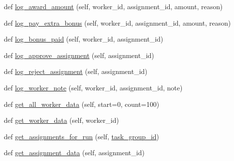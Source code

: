 \begin{DoxyCompactItemize}
\item 
def \hyperlink{classparlai_1_1mturk_1_1core_1_1dev_1_1mturk__data__handler_1_1MTurkDataHandler_a70ba0bf16c83138626c33c71a041674f}{log\+\_\+award\+\_\+amount} (self, worker\+\_\+id, assignment\+\_\+id, amount, reason)
\item 
def \hyperlink{classparlai_1_1mturk_1_1core_1_1dev_1_1mturk__data__handler_1_1MTurkDataHandler_abf54a08cd2b503358c52229258c1f2c6}{log\+\_\+pay\+\_\+extra\+\_\+bonus} (self, worker\+\_\+id, assignment\+\_\+id, amount, reason)
\item 
def \hyperlink{classparlai_1_1mturk_1_1core_1_1dev_1_1mturk__data__handler_1_1MTurkDataHandler_aaa2ae4ebfd4b668bdef7642cdf4d9392}{log\+\_\+bonus\+\_\+paid} (self, worker\+\_\+id, assignment\+\_\+id)
\item 
def \hyperlink{classparlai_1_1mturk_1_1core_1_1dev_1_1mturk__data__handler_1_1MTurkDataHandler_a57266a8380587e0256b966ad780ec7d7}{log\+\_\+approve\+\_\+assignment} (self, assignment\+\_\+id)
\item 
def \hyperlink{classparlai_1_1mturk_1_1core_1_1dev_1_1mturk__data__handler_1_1MTurkDataHandler_afd8d5abb26cbd00f96ff7d8ad44b1f49}{log\+\_\+reject\+\_\+assignment} (self, assignment\+\_\+id)
\item 
def \hyperlink{classparlai_1_1mturk_1_1core_1_1dev_1_1mturk__data__handler_1_1MTurkDataHandler_acb69b500f70e42e4e8a99e224534cc27}{log\+\_\+worker\+\_\+note} (self, worker\+\_\+id, assignment\+\_\+id, note)
\item 
def \hyperlink{classparlai_1_1mturk_1_1core_1_1dev_1_1mturk__data__handler_1_1MTurkDataHandler_a3e7435a5ea6af94b4d668c095184a234}{get\+\_\+all\+\_\+worker\+\_\+data} (self, start=0, count=100)
\item 
def \hyperlink{classparlai_1_1mturk_1_1core_1_1dev_1_1mturk__data__handler_1_1MTurkDataHandler_a748e6271a1618272cd17ec412b2c2a25}{get\+\_\+worker\+\_\+data} (self, worker\+\_\+id)
\item 
def \hyperlink{classparlai_1_1mturk_1_1core_1_1dev_1_1mturk__data__handler_1_1MTurkDataHandler_aa3f132c04075d005d6639b938414ac0f}{get\+\_\+assignments\+\_\+for\+\_\+run} (self, \hyperlink{classparlai_1_1mturk_1_1core_1_1dev_1_1mturk__data__handler_1_1MTurkDataHandler_af4bebaca067ce2d388fe76ee8859e1bd}{task\+\_\+group\+\_\+id})
\item 
def \hyperlink{classparlai_1_1mturk_1_1core_1_1dev_1_1mturk__data__handler_1_1MTurkDataHandler_a70ee72567e0c94eea130cdee21549ada}{get\+\_\+assignment\+\_\+data} (self, assignment\+\_\+id)
\item 

\end{DoxyCompactItemize}
